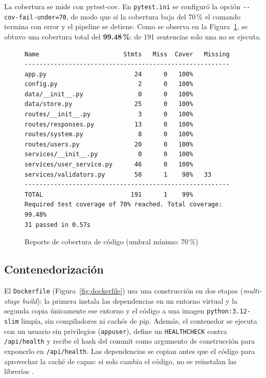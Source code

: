 \documentclass[12pt,letterpaper]{article}
\begin{document}
La cobertura se mide con pytest-cov. En \texttt{pytest.ini} se configuró la opción
\texttt{-{}-cov-fail-under=70}, de modo que si la cobertura baja del 70\,\% el comando termina con
error y el pipeline se detiene. Como se observa en la Figura~\ref{fig:cobertura}, se obtuvo una
cobertura total del \textbf{99.48\,\%}: de 191 sentencias solo una no se ejecuta.

\begin{figure}[H]
\centering
\begin{minipage}{0.95\textwidth}
\begin{lstlisting}[style=term]
Name                       Stmts   Miss  Cover   Missing
--------------------------------------------------------
app.py                        24      0   100%
config.py                      2      0   100%
data/__init__.py               0      0   100%
data/store.py                 25      0   100%
routes/__init__.py             3      0   100%
routes/responses.py           13      0   100%
routes/system.py               8      0   100%
routes/users.py               20      0   100%
services/__init__.py           0      0   100%
services/user_service.py      46      0   100%
services/validators.py        50      1    98%   33
--------------------------------------------------------
TOTAL                        191      1    99%
Required test coverage of 70% reached. Total coverage: 99.48%
31 passed in 0.57s
\end{lstlisting}
\end{minipage}
\caption{Reporte de cobertura de código (umbral mínimo: 70\,\%)}
\label{fig:cobertura}
\end{figure}

\subsection{Contenedorización}

El \texttt{Dockerfile} (Figura~\ref{fig:dockerfile}) usa una construcción en dos etapas
(\textit{multi-stage build}): la primera instala las dependencias en un entorno virtual y la
segunda copia únicamente ese entorno y el código a una imagen \texttt{python:3.12-slim} limpia,
sin compiladores ni cachés de pip. Además, el contenedor se ejecuta con un usuario sin privilegios
(\texttt{appuser}), define un \texttt{HEALTHCHECK} contra \texttt{/api/health} y recibe el hash del
commit como argumento de construcción para exponerlo en \texttt{/api/health}. Las dependencias se
copian antes que el código para aprovechar la caché de capas: si solo cambia el código, no se
reinstalan las librerías \cite{dockerdocs}.
\end{document}
